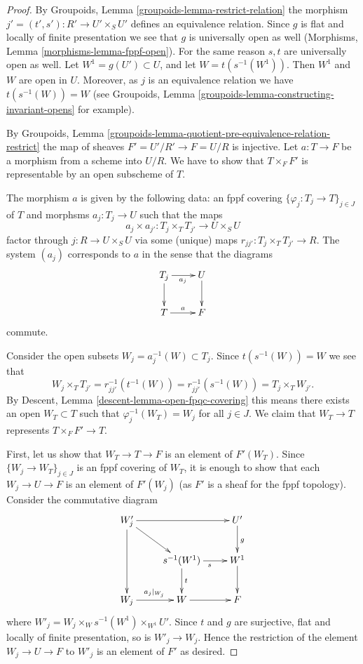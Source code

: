 \begin{proof}
By Groupoids, Lemma \ref{groupoids-lemma-restrict-relation}
the morphism $j' = (t', s') : R' \to U' \times_S U'$
defines an equivalence relation. Since $g$ is flat and locally of
finite presentation we see that $g$ is universally open as well
(Morphisms, Lemma \ref{morphisms-lemma-fppf-open}).
For the same reason $s, t$ are universally open as well.
Let $W^1 = g(U') \subset U$, and let $W = t(s^{-1}(W^1))$.
Then $W^1$ and $W$ are open in $U$. Moreover, as $j$ is an
equivalence relation we have $t(s^{-1}(W)) = W$ (see
Groupoids, Lemma \ref{groupoids-lemma-constructing-invariant-opens}
for example).

\medskip\noindent
By
Groupoids,
Lemma \ref{groupoids-lemma-quotient-pre-equivalence-relation-restrict}
the map of sheaves $F' = U'/R' \to F = U/R$ is injective.
Let $a : T \to F$ be a morphism from a scheme into $U/R$.
We have to show that $T \times_F F'$ is representable
by an open subscheme of $T$.

\medskip\noindent
The morphism $a$ is given by the following data:
an fppf covering $\{\varphi_j : T_j \to T\}_{j \in J}$ of $T$ and
morphsms $a_j : T_j \to U$ such that the maps
$$
a_j \times a_{j'} :
T_j \times_T T_{j'}
\longrightarrow
U \times_S U
$$
factor through $j : R \to U \times_S U$ via some (unique) maps
$r_{jj'} : T_j \times_T T_{j'} \to R$. The system
$(a_j)$ corresponds to $a$ in the sense that the diagrams
$$
\xymatrix{
T_j \ar[r]_{a_j} \ar[d] & U \ar[d] \\
T \ar[r]^a & F
}
$$
commute.

\medskip\noindent
Consider the open subsets $W_j = a_j^{-1}(W) \subset T_j$.
Since $t(s^{-1}(W)) = W$ we see that
$$
W_j \times_T T_{j'} =
r_{jj'}^{-1}(t^{-1}(W)) = r_{jj'}^{-1}(s^{-1}(W)) =
T_j \times_T W_{j'}.
$$
By
Descent, Lemma \ref{descent-lemma-open-fpqc-covering}
this means there exists an open
$W_T \subset T$ such that $\varphi_j^{-1}(W_T) = W_j$ for all $j \in J$.
We claim that $W_T \to T$ represents $T \times_F F' \to T$.

\medskip\noindent
First, let us show that $W_T \to T \to F$ is an element of
$F'(W_T)$. Since $\{W_j \to W_T\}_{j \in J}$ is an
fppf covering of $W_T$, it is enough to show that
each $W_j \to U \to F$ is an element of $F'(W_j)$ (as $F'$ is a sheaf
for the fppf topology). Consider the commutative diagram
$$
\xymatrix{
W'_j \ar[rr] \ar[dd] \ar[rd] & & U' \ar[d]^g \\
& s^{-1}(W^1) \ar[r]_s \ar[d]^t & W^1 \ar[d] \\
W_j \ar[r]^{a_j|_{W_j}} & W \ar[r] & F
}
$$
where $W'_j = W_j \times_W s^{-1}(W^1) \times_{W^1} U'$.
Since $t$ and $g$ are surjective, flat and locally of finite
presentation, so is $W'_j \to W_j$. Hence the restriction of
the element $W_j \to U \to F$ to $W'_j$ is an element of $F'$
as desired.


\end{proof}
